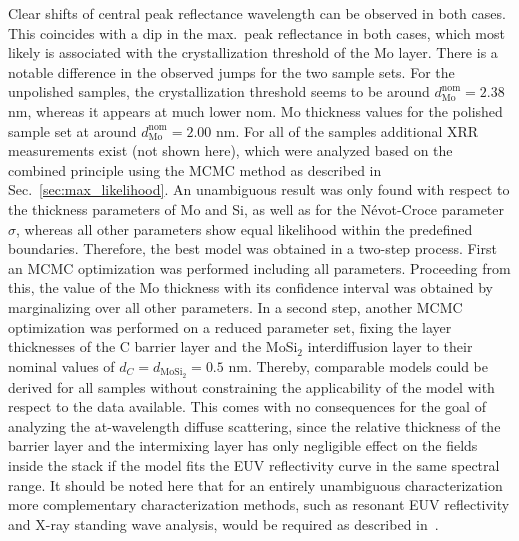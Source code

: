 Clear shifts of central peak reflectance wavelength can be observed in both cases. This coincides with a dip in the max.~peak reflectance in both cases, which most likely is associated with the crystallization threshold of the Mo layer. There is a notable difference in the observed jumps for the two sample sets. For the unpolished samples, the crystallization threshold seems to be around $d^\text{nom}_\text{Mo} =2.38$ nm, whereas it appears at much lower nom. Mo thickness values for the polished sample set at around  $d^\text{nom}_\text{Mo} =2.00$ nm. For all of the samples additional XRR measurements exist (not shown here), which were analyzed based on the combined principle using the MCMC method as described in Sec.~\ref{sec:max_likelihood}. An unambiguous result was only found with respect to the thickness parameters of Mo and Si, as well as for the N\'{e}vot-Croce parameter $\sigma$, whereas all other parameters show equal likelihood within the predefined boundaries. Therefore, the best model was obtained in a two-step process. First an MCMC optimization was performed including all parameters. Proceeding from this, the value of the Mo thickness with its confidence interval was obtained by marginalizing over all other parameters. In a second step, another MCMC optimization was performed on a reduced parameter set, fixing the layer thicknesses of the C barrier layer and the MoSi$_2$ interdiffusion layer to their nominal values of $d_C = d_{\text{MoSi}_2} = 0.5 $ nm. Thereby, comparable models could be derived for all samples without constraining the applicability of the model with respect to the data available. This comes with no consequences for the goal of analyzing the at-wavelength diffuse scattering, since the relative thickness of the barrier layer and the intermixing layer has only negligible effect on the fields inside the stack if the model fits the EUV reflectivity curve in the same spectral range. It should be noted here that for an entirely unambiguous characterization more complementary characterization methods, such as resonant EUV reflectivity and X-ray standing wave analysis, would be required as described in~\cite{haase_multiparameter_2016}.

